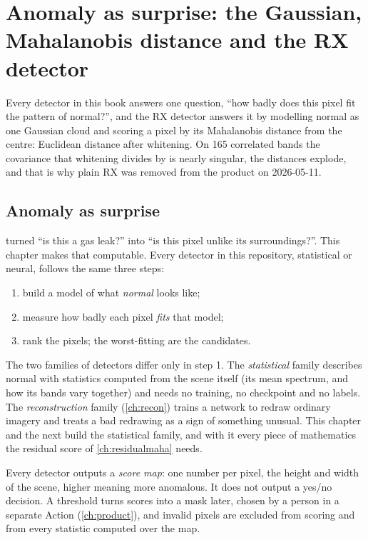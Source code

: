 \chapter{Anomaly as surprise: the Gaussian, Mahalanobis distance and the RX detector}\label{ch:rx}

\begin{onething}
Every detector in this book answers one question, ``how badly does this pixel fit the pattern of
normal?'', and the RX detector answers it by modelling normal as one Gaussian cloud and scoring a
pixel by its Mahalanobis distance from the centre: Euclidean distance after whitening. On 165
correlated bands the covariance that whitening divides by is nearly singular, the distances explode,
and that is why plain RX was removed from the product on 2026-05-11.
\end{onething}

\section{Anomaly as surprise}\label{sec:rx:surprise}

 turned ``is this a gas leak?'' into ``is this pixel unlike its surroundings?''.
This chapter makes that computable. Every detector in this repository, statistical or neural,
follows the same three steps:
\begin{enumerate}
  \item build a model of what \emph{normal} looks like;
  \item measure how badly each pixel \emph{fits} that model;
  \item rank the pixels; the worst-fitting are the candidates.
\end{enumerate}
The two families of detectors differ only in step 1. The \emph{statistical} family describes normal
with statistics computed from the scene itself (its mean spectrum, and how its bands vary
together) and needs no training, no checkpoint and no labels. The \emph{reconstruction} family
(\cref{ch:recon}) trains a network to redraw ordinary imagery and treats a bad redrawing as a sign
of something unusual. This chapter and the next build the statistical family, and with it every
piece of mathematics the residual score of \cref{ch:residualmaha} needs.

Every detector outputs a \emph{score map}: one number per pixel, the height and
width of the scene, higher meaning more anomalous. It does not output a yes/no decision. A threshold
turns scores into a mask later, chosen by a person in a separate Action (\cref{ch:product}), and
invalid pixels are excluded from scoring and from every statistic computed over the map.

